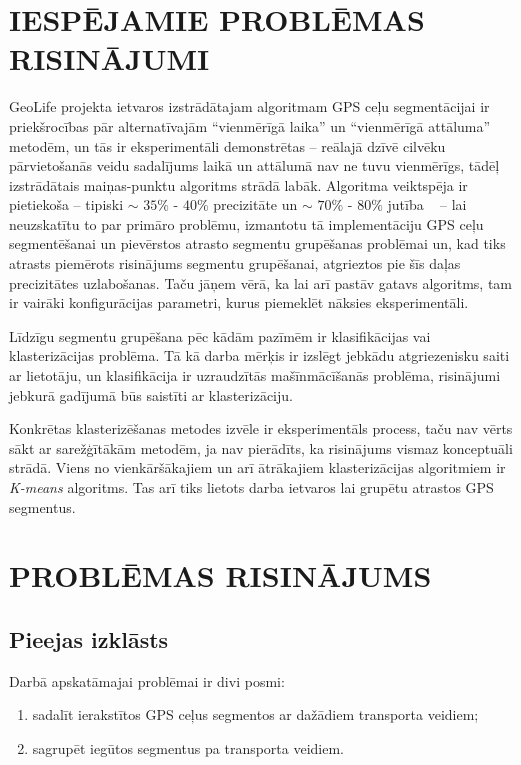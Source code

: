 \documentclass{ludis}
\begin{document}
\chapter{IESPĒJAMIE PROBLĒMAS RISINĀJUMI}
GeoLife projekta ietvaros izstrādātajam algoritmam GPS ceļu segmentācijai ir priekšrocības 
pār alternatīvajām ``vienmērīgā laika'' un ``vienmērīgā attāluma'' metodēm, un tās ir
ekspe\-rimentāli demonstrētas -- reālajā dzīvē cilvēku pārvietošanās veidu sadalījums laikā 
un attālumā nav ne tuvu vienmērīgs, tādēļ izstrādātais maiņas-punktu algoritms strādā labāk.
Algoritma veiktspēja ir pietiekoša -- tipiski $\sim$ $35\%$ - $40\%$
precizitāte un $\sim$ $70\%$ - $80\%$ jutība ~\cite{zheng_gps_segmentation} -- 
lai neuzskatītu to par primāro problēmu, izmantotu tā implementāciju GPS ceļu segmentēšanai 
un pievērstos atrasto segmentu grupēšanas problēmai un, kad tiks atrasts piemērots risinājums
segmentu grupēšanai, atgrieztos pie šīs daļas precizitātes uzlabošanas. Taču jāņem vērā, ka lai
arī pastāv gatavs algoritms, tam ir vairāki konfigurācijas parametri, kurus piemeklēt nāksies
eksperimentāli.

Līdzīgu segmentu grupēšana pēc kādām pazīmēm ir klasifikācijas vai klasterizācijas \linebreak 
problēma. Tā kā darba mērķis ir izslēgt jebkādu atgriezenisku saiti ar lietotāju, un klasifikācija 
ir uzraudzītās mašīnmācīšanās problēma, risinājumi jebkurā gadījumā būs saistīti 
ar \linebreak klasterizāciju.

Konkrētas klasterizēšanas metodes izvēle ir eksperimentāls process, taču nav vērts sākt ar 
sarežģītākām metodēm, ja nav pierādīts, ka risinājums vismaz konceptuāli strādā. Viens
no vienkāršākajiem un arī ātrākajiem klasterizācijas algoritmiem ir \emph{K-means} algoritms.
Tas arī tiks lietots darba ietvaros lai grupētu atrastos GPS segmentus.

\chapter{PROBLĒMAS RISINĀJUMS}
\section{Pieejas izklāsts}
Darbā apskatāmajai problēmai ir divi posmi:
\begin{enumerate}
\item sadalīt ierakstītos GPS ceļus segmentos ar dažādiem transporta veidiem;
\item sagrupēt iegūtos segmentus pa transporta veidiem.
\end{enumerate}
\end{document}
